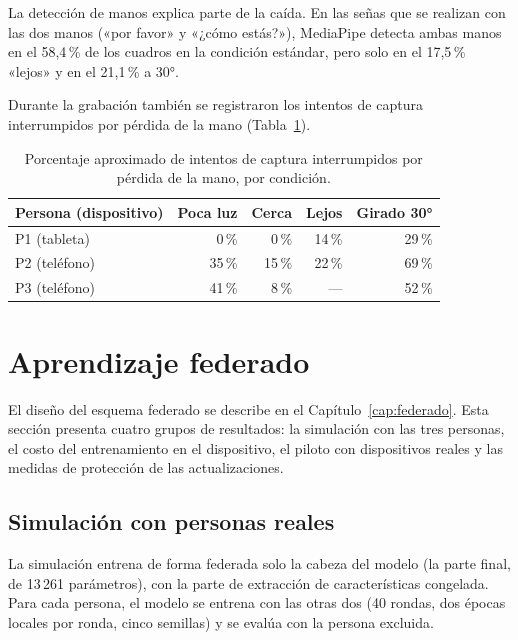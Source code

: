 La detección de manos explica parte de la caída. En las señas que se realizan con las dos manos («por favor» y «¿cómo estás?»), MediaPipe detecta ambas manos en el 58,4\,\% de los cuadros en la condición estándar, pero solo en el 17,5\,\% «lejos» y en el 21,1\,\% a 30°.

Durante la grabación también se registraron los intentos de captura interrumpidos por pérdida de la mano (Tabla~\ref{tab:cortes}).

\begin{table}[h]
    \centering
    \begin{tabular}{lrrrr}
        \toprule
        Persona (dispositivo) & Poca luz & Cerca & Lejos & Girado 30° \\
        \midrule
        P1 (tableta) & 0\,\% & 0\,\% & 14\,\% & 29\,\% \\
        P2 (teléfono) & 35\,\% & 15\,\% & 22\,\% & 69\,\% \\
        P3 (teléfono) & 41\,\% & 8\,\% & --- & 52\,\% \\
        \bottomrule
    \end{tabular}
    \caption{Porcentaje aproximado de intentos de captura interrumpidos por pérdida de la mano, por condición.}
    \label{tab:cortes}
\end{table}

\section{Aprendizaje federado}
\label{sec:res-federado}

El diseño del esquema federado se describe en el Capítulo~\ref{cap:federado}. Esta sección presenta cuatro grupos de resultados: la simulación con las tres personas, el costo del entrenamiento en el dispositivo, el piloto con dispositivos reales y las medidas de protección de las actualizaciones.

\subsection{Simulación con personas reales}

La simulación entrena de forma federada solo la cabeza del modelo (la parte final, de 13\,261 parámetros), con la parte de extracción de características congelada. Para cada persona, el modelo se entrena con las otras dos (40 rondas, dos épocas locales por ronda, cinco semillas) y se evalúa con la persona excluida.

